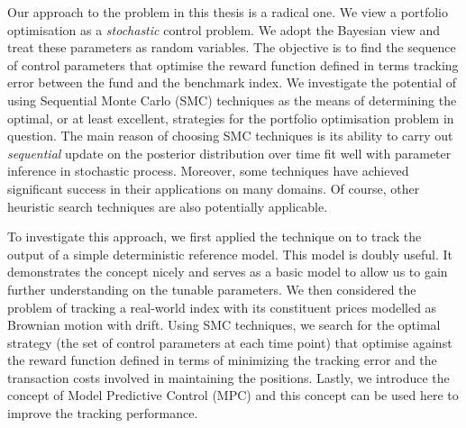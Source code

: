 Our approach to the problem in this thesis is a radical one. We view a portfolio optimisation as a \emph{stochastic} control problem. We adopt the Bayesian view and treat these parameters as random variables. The objective is to find the sequence of control parameters that optimise the reward function defined in terms tracking error between the fund and the benchmark index. We investigate the potential of using Sequential Monte Carlo (SMC) techniques as the means of determining the optimal, or at least excellent, strategies for the portfolio optimisation problem in question. The main reason of choosing SMC techniques is its ability to carry out \emph{sequential} update on the posterior distribution over time fit well with parameter inference in stochastic process. Moreover, some techniques have achieved significant success in their applications on many domains. Of course, other heuristic search techniques are also potentially applicable.

To investigate this approach, we first applied the technique on to track the output of a simple deterministic reference model. This model is doubly useful. It demonstrates the concept nicely and serves as a basic model to allow us to gain further understanding on the tunable parameters. We then considered the problem of tracking a real-world index with its constituent prices modelled as Brownian motion with drift. Using SMC techniques, we search for the optimal strategy (the set of control parameters at each time point) that optimise against the reward function defined in terms of minimizing the tracking error and the transaction costs involved in maintaining the positions. Lastly, we introduce the concept of Model Predictive Control (MPC) and this concept can be used here to improve the tracking performance.

